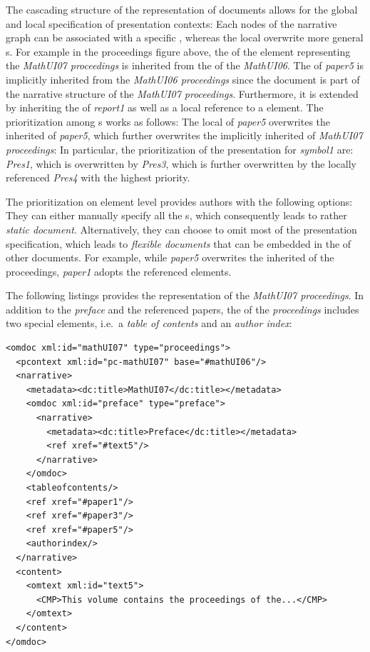\documentclass[a4paper]{article}
\begin{document}
The cascading structure of the {\omdoc} representation of documents allows for the global
and local specification of presentation contexts: Each nodes of the narrative graph can be
associated with a specific {}, whereas the local {}
overwrite more general {}s. For example in the proceedings figure above,
the {} of the {} element representing the {\emph{MathUI07
    proceedings}} is inherited from the {} of the {\emph{MathUI06}}. The
{} of {\emph{paper5}} is implicitly inherited from the {\emph{MathUI06
    proceedings}} since the document is part of the narrative structure of the
{\emph{MathUI07 proceedings}}. Furthermore, it is extended by inheriting the
{} of {\emph{report1}} as well as a local reference to a
{} element. The prioritization among {}s works as
follows: The local {} of {\emph{paper5}} overwrites the inherited
{} of {\emph{paper5}}, which further overwrites the implicitly inherited
{} of {\emph{MathUI07 proceedings}}: In particular, the prioritization
of the presentation for {\emph{symbol1}} are: {\emph{Pres1}}, which is overwritten by
{\emph{Pres3}}, which is further overwritten by the locally referenced {\emph{Pres4}} with
the highest priority.

The prioritization on {} element level provides authors with the following
options: They can either manually specify all the {}s, which
consequently leads to rather {\emph{static document}}. Alternatively, they can choose to
omit most of the presentation specification, which leads to {\emph{flexible documents}}
that can be embedded in the {} of other documents. For example, while
{\emph{paper5}} overwrites the inherited {} of the proceedings,
{\emph{paper1}} adopts the referenced {} elements.

The following listings provides the {\omdoc} representation of the {\emph{MathUI07
proceedings}}. In addition to the {\emph{preface}} and the referenced papers, the
{} of the {\emph{proceedings}} includes two special elements,
i.e.\ a {\emph{table of contents}} and an {\emph{author index}}:

\begin{lstlisting}[mathescape,numbers=none,caption={Representation of the MathUI
proceedings},label=lst:MathUIproceedings]
<omdoc xml:id="mathUI07" type="proceedings">
  <pcontext xml:id="pc-mathUI07" base="#mathUI06"/>
  <narrative>
    <metadata><dc:title>MathUI07</dc:title></metadata>
    <omdoc xml:id="preface" type="preface">
      <narrative>
        <metadata><dc:title>Preface</dc:title></metadata>
        <ref xref="#text5"/>
      </narrative>
    </omdoc>
    <tableofcontents/>
    <ref xref="#paper1"/>
    <ref xref="#paper3"/>
    <ref xref="#paper5"/>
    <authorindex/>
  </narrative>
  <content>
    <omtext xml:id="text5">
      <CMP>This volume contains the proceedings of the...</CMP>
    </omtext>
  </content>
</omdoc>
\end{lstlisting}
\end{document}
